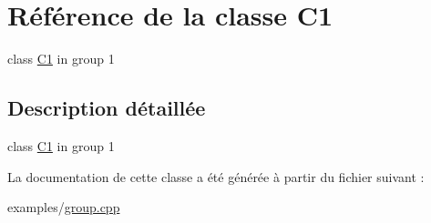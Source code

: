 \hypertarget{class_c1}{}\section{Référence de la classe C1}
\label{class_c1}


class \hyperlink{class_c1}{C1} in group 1  




\subsection{Description détaillée}
class \hyperlink{class_c1}{C1} in group 1 

La documentation de cette classe a été générée à partir du fichier suivant \+:\begin{DoxyCompactItemize}
\item 
examples/\hyperlink{group_8cpp}{group.\+cpp}\end{DoxyCompactItemize}
